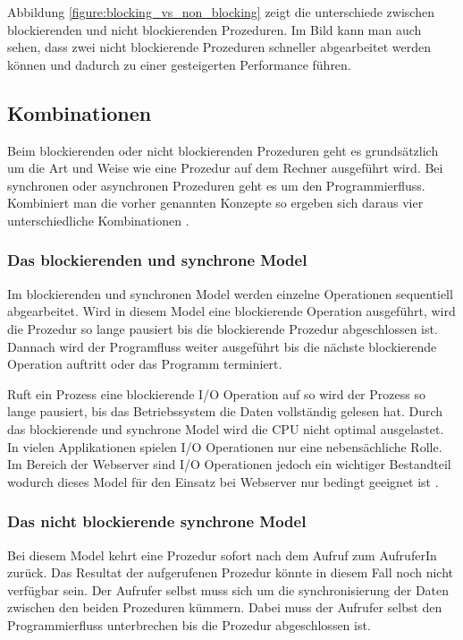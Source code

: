 Abbildung \ref{figure:blocking_vs_non_blocking} zeigt die unterschiede zwischen blockierenden und nicht blockierenden Prozeduren. Im Bild kann man auch sehen, dass zwei nicht blockierende Prozeduren schneller abgearbeitet werden können und dadurch zu einer gesteigerten Performance führen. 

\subsection{Kombinationen}
Beim blockierenden oder nicht blockierenden Prozeduren geht es grundsätzlich um die Art und Weise wie eine Prozedur auf dem Rechner ausgeführt wird. Bei synchronen oder asynchronen Prozeduren geht es um den Programmierfluss. Kombiniert man die vorher genannten Konzepte so ergeben sich daraus vier unterschiedliche Kombinationen \cite[p. 48]{Erb2012}. 

\subsubsection{Das blockierenden und synchrone Model}
Im blockierenden und synchronen Model werden einzelne Operationen sequentiell abgearbeitet. Wird in diesem Model eine blockierende Operation ausgeführt, wird die Prozedur so lange pausiert bis die blockierende Prozedur abgeschlossen ist. Dannach wird der Programfluss weiter ausgeführt bis die nächste blockierende Operation auftritt oder das Programm terminiert.

Ruft ein Prozess eine blockierende I/O Operation auf so wird der Prozess so lange pausiert, bis das Betriebssystem die Daten vollständig gelesen hat. Durch das blockierende und synchrone Model wird die CPU nicht optimal ausgelastet. In vielen Applikationen spielen I/O Operationen nur eine nebensächliche Rolle. Im Bereich der Webserver sind I/O Operationen jedoch ein wichtiger Bestandteil wodurch dieses Model für den Einsatz bei Webserver nur bedingt geeignet ist \cite[p. 48]{Erb2012}.


\subsubsection{Das nicht blockierende synchrone Model}

Bei diesem Model kehrt eine Prozedur sofort nach dem Aufruf zum AufruferIn zurück. Das Resultat der aufgerufenen Prozedur könnte in diesem Fall noch nicht verfügbar sein. Der Aufrufer selbst muss sich um die synchronisierung der Daten zwischen den beiden Prozeduren kümmern. Dabei muss der Aufrufer selbst den Programmierfluss unterbrechen bis die Prozedur abgeschlossen ist. 


